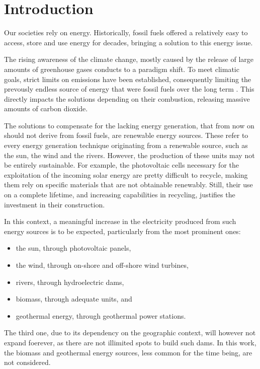 \section{Introduction}

Our societies rely on energy. Historically, fossil fuels offered a relatively easy to access, store and use energy for decades, bringing a solution to this energy issue.

The rising awareness of the climate change, mostly caused by the release of large amounts of greenhouse gases conducts to a paradigm shift. To meet climatic goals, strict limits on emissions have been established, consequently limiting the prevously endless source of energy that were fossil fuels over the long term \cite{ar6-ipcc-wg3}. This directly impacts the solutions depending on their combustion, releasing massive amounts of carbon dioxide.

The solutions to compensate for the lacking energy generation, that from now on should not derive from fossil fuels, are renewable energy sources. These refer to every energy generation technique originating from a renewable source, such as the sun, the wind and the rivers. However, the production of these units may not be entirely sustainable. For example, the photovoltaic cells necessary for the exploitation of the incoming solar energy are pretty difficult to recycle, making them rely on specific materials that are not obtainable renewably. Still, their use on a complete lifetime, and increasing capabilities in recycling, justifies the investment in their construction.

In this context, a meaningful increase in the electricity produced from such energy sources is to be expected, particularly from the most prominent ones:
\begin{itemize}
    \item the sun, through photovoltaic panels,
    \item the wind, through on-shore and off-shore wind turbines,
    \item rivers, through hydroelectric dams,
    \item biomass, through adequate units, and
    \item geothermal energy, through geothermal power stations.
\end{itemize}

The third one, due to its dependency on the geographic context, will however not expand foerever, as there are not illimited spots to build such dams. In this work, the biomass and geothermal energy sources, less common for the time being, are not considered.

